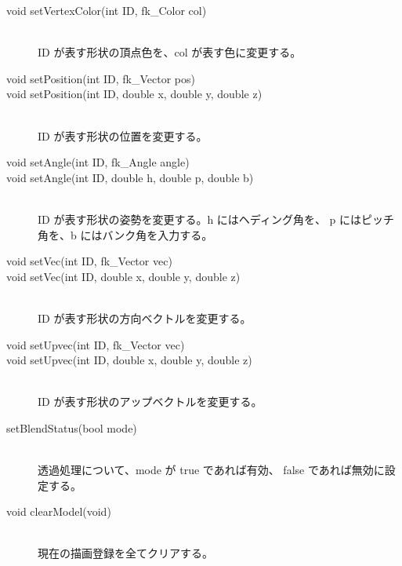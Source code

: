 \begin{description}
 \item[\hspace*{0.6cm}void setVertexColor(int ID, fk\_Color col)] ~ \\
	ID が表す形状の頂点色を、col が表す色に変更する。\\

 \item[\hspace*{0.6cm}void setPosition(int ID, fk\_Vector pos)]
 \item[\hspace*{0.6cm}void setPosition(int ID, double x, double y, double z)] ~ \\
	ID が表す形状の位置を変更する。\\

 \item[\hspace*{0.6cm}void setAngle(int ID, fk\_Angle angle)]
 \item[\hspace*{0.6cm}void setAngle(int ID, double h, double p, double b)] ~ \\
	ID が表す形状の姿勢を変更する。h にはヘディング角を、
	p にはピッチ角を、b にはバンク角を入力する。\\

 \item[\hspace*{0.6cm}void setVec(int ID, fk\_Vector vec)]
 \item[\hspace*{0.6cm} void setVec(int ID, double x, double y, double z)] ~ \\
	ID が表す形状の方向ベクトルを変更する。\\

 \item[\hspace*{0.6cm}void setUpvec(int ID, fk\_Vector vec)]
 \item[\hspace*{0.6cm}void setUpvec(int ID, double x, double y, double z)] ~ \\
	ID が表す形状のアップベクトルを変更する。\\

 \item[\hspace*{0.6cm}setBlendStatus(bool mode)] ~ \\
	透過処理について、mode が true であれば有効、
	false であれば無効に設定する。\\

 \item[\hspace*{0.6cm}void clearModel(void)] ~ \\
	現在の描画登録を全てクリアする。\\


\end{description}
